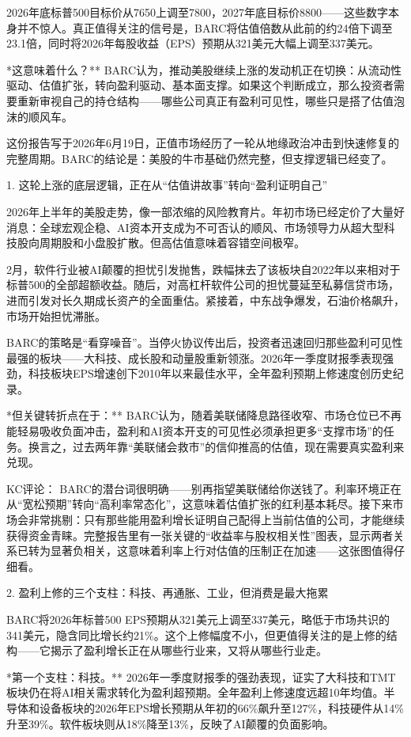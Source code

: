 \documentclass[11pt]{ctexart}
\begin{document}
2026年底标普500目标价从7650上调至7800，2027年底目标价8800——这些数字本身并不惊人。真正值得关注的信号是，BARC将估值倍数从此前的约24倍下调至23.1倍，同时将2026年每股收益（EPS）预期从321美元大幅上调至337美元。

*这意味着什么？** BARC认为，推动美股继续上涨的发动机正在切换：从流动性驱动、估值扩张，转向盈利驱动、基本面支撑。如果这个判断成立，那么投资者需要重新审视自己的持仓结构——哪些公司真正有盈利可见性，哪些只是搭了估值泡沫的顺风车。

这份报告写于2026年6月19日，正值市场经历了一轮从地缘政治冲击到快速修复的完整周期。BARC的结论是：美股的牛市基础仍然完整，但支撑逻辑已经变了。

1. 这轮上涨的底层逻辑，正在从“估值讲故事”转向“盈利证明自己”

2026年上半年的美股走势，像一部浓缩的风险教育片。年初市场已经定价了大量好消息：全球宏观企稳、AI资本开支成为不可否认的顺风、市场领导力从超大型科技股向周期股和小盘股扩散。但高估值意味着容错空间极窄。

2月，软件行业被AI颠覆的担忧引发抛售，跌幅抹去了该板块自2022年以来相对于标普500的全部超额收益。随后，对高杠杆软件公司的担忧蔓延至私募信贷市场，进而引发对长久期成长资产的全面重估。紧接着，中东战争爆发，石油价格飙升，市场开始担忧滞胀。

BARC的策略是“看穿噪音”。当停火协议传出后，投资者迅速回归那些盈利可见性最强的板块——大科技、成长股和动量股重新领涨。2026年一季度财报季表现强劲，科技板块EPS增速创下2010年以来最佳水平，全年盈利预期上修速度创历史纪录。

*但关键转折点在于：** BARC认为，随着美联储降息路径收窄、市场仓位已不再能轻易吸收负面冲击，盈利和AI资本开支的可见性必须承担更多“支撑市场”的任务。换言之，过去两年靠“美联储会救市”的信仰推高的估值，现在需要真实盈利来兑现。

KC评论： BARC的潜台词很明确——别再指望美联储给你送钱了。利率环境正在从“宽松预期”转向“高利率常态化”，这意味着估值扩张的红利基本耗尽。接下来市场会非常挑剔：只有那些能用盈利增长证明自己配得上当前估值的公司，才能继续获得资金青睐。完整报告里有一张关键的“收益率与股权相关性”图表，显示两者关系已转为显著负相关，这意味着利率上行对估值的压制正在加速——这张图值得仔细看。

2. 盈利上修的三个支柱：科技、再通胀、工业，但消费是最大拖累

BARC将2026年标普500 EPS预期从321美元上调至337美元，略低于市场共识的341美元，隐含同比增长约21\%。这个上修幅度不小，但更值得关注的是上修的结构——它揭示了盈利增长正在从哪些行业来，又将从哪些行业走。

*第一个支柱：科技。** 2026年一季度财报季的强劲表现，证实了大科技和TMT板块仍在将AI相关需求转化为盈利超预期。全年盈利上修速度远超10年均值。半导体和设备板块的2026年EPS增长预期从年初的66\%飙升至127\%，科技硬件从14\%升至39\%。软件板块则从18\%降至13\%，反映了AI颠覆的负面影响。
\end{document}
